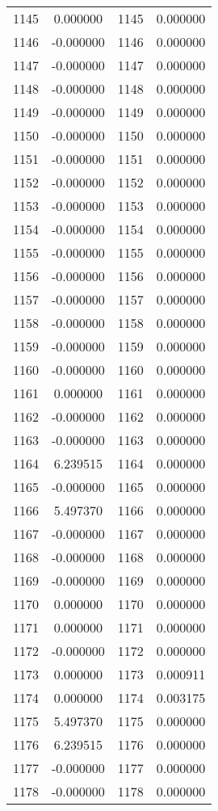 \documentclass[12pt]{article}
\begin{document}
\begin{longtable}{@{}cccc@{}}
1145 & 0.000000 & 1145 & 0.000000 \\
1146 & -0.000000 & 1146 & 0.000000 \\
1147 & -0.000000 & 1147 & 0.000000 \\
1148 & -0.000000 & 1148 & 0.000000 \\
1149 & -0.000000 & 1149 & 0.000000 \\
1150 & -0.000000 & 1150 & 0.000000 \\
1151 & -0.000000 & 1151 & 0.000000 \\
1152 & -0.000000 & 1152 & 0.000000 \\
1153 & -0.000000 & 1153 & 0.000000 \\
1154 & -0.000000 & 1154 & 0.000000 \\
1155 & -0.000000 & 1155 & 0.000000 \\
1156 & -0.000000 & 1156 & 0.000000 \\
1157 & -0.000000 & 1157 & 0.000000 \\
1158 & -0.000000 & 1158 & 0.000000 \\
1159 & -0.000000 & 1159 & 0.000000 \\
1160 & -0.000000 & 1160 & 0.000000 \\
1161 & 0.000000 & 1161 & 0.000000 \\
1162 & -0.000000 & 1162 & 0.000000 \\
1163 & -0.000000 & 1163 & 0.000000 \\
1164 & 6.239515 & 1164 & 0.000000 \\
1165 & -0.000000 & 1165 & 0.000000 \\
1166 & 5.497370 & 1166 & 0.000000 \\
1167 & -0.000000 & 1167 & 0.000000 \\
1168 & -0.000000 & 1168 & 0.000000 \\
1169 & -0.000000 & 1169 & 0.000000 \\
1170 & 0.000000 & 1170 & 0.000000 \\
1171 & 0.000000 & 1171 & 0.000000 \\
1172 & -0.000000 & 1172 & 0.000000 \\
1173 & 0.000000 & 1173 & 0.000911 \\
1174 & 0.000000 & 1174 & 0.003175 \\
1175 & 5.497370 & 1175 & 0.000000 \\
1176 & 6.239515 & 1176 & 0.000000 \\
1177 & -0.000000 & 1177 & 0.000000 \\
1178 & -0.000000 & 1178 & 0.000000 \\

\end{longtable}
\end{document}
